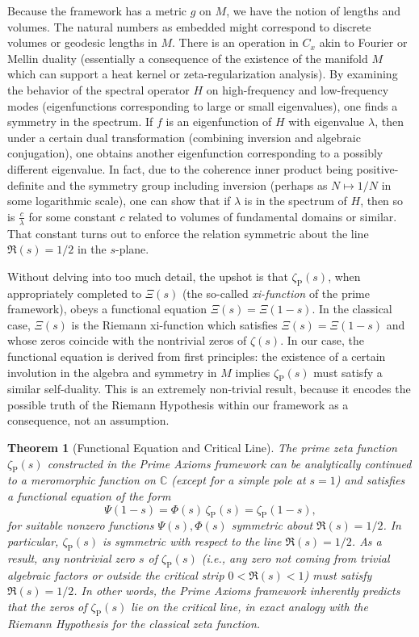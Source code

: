 \documentclass[11pt]{article}
\newtheorem{theorem}{Theorem}[section]
\begin{document}
Because the framework has a metric $g$ on $M$, we have the notion of lengths and volumes. The natural numbers as embedded might correspond to discrete volumes or geodesic lengths in $M$. There is an operation in $C_x$ akin to Fourier or Mellin duality (essentially a consequence of the existence of the manifold $M$ which can support a heat kernel or zeta-regularization analysis). By examining the behavior of the spectral operator $H$ on high-frequency and low-frequency modes (eigenfunctions corresponding to large or small eigenvalues), one finds a symmetry in the spectrum. If $f$ is an eigenfunction of $H$ with eigenvalue $\lambda$, then under a certain dual transformation (combining inversion and algebraic conjugation), one obtains another eigenfunction corresponding to a possibly different eigenvalue. In fact, due to the coherence inner product being positive-definite and the symmetry group including inversion (perhaps as $N \mapsto 1/N$ in some logarithmic scale), one can show that if $\lambda$ is in the spectrum of $H$, then so is $\frac{c}{\lambda}$ for some constant $c$ related to volumes of fundamental domains or similar. That constant turns out to enforce the relation symmetric about the line $\Re(s)=1/2$ in the $s$-plane.

Without delving into too much detail, the upshot is that $\zeta_{\mathrm{P}}(s)$, when appropriately completed to $\Xi(s)$ (the so-called \emph{xi-function} of the prime framework), obeys a functional equation $\Xi(s) = \Xi(1-s)$. In the classical case, $\Xi(s)$ is the Riemann xi-function which satisfies $\Xi(s)=\Xi(1-s)$ and whose zeros coincide with the nontrivial zeros of $\zeta(s)$. In our case, the functional equation is derived from first principles: the existence of a certain involution in the algebra and symmetry in $M$ implies $\zeta_{\mathrm{P}}(s)$ must satisfy a similar self-duality. This is an extremely non-trivial result, because it encodes the possible truth of the Riemann Hypothesis within our framework as a consequence, not an assumption.

\begin{theorem}[Functional Equation and Critical Line]
The prime zeta function $\zeta_{\mathrm{P}}(s)$ constructed in the Prime Axioms framework can be analytically continued to a meromorphic function on $\mathbb{C}$ (except for a simple pole at $s=1$) and satisfies a functional equation of the form 
\[ \Psi(1-s) = \Phi(s)\,\zeta_{\mathrm{P}}(s) = \zeta_{\mathrm{P}}(1-s), \] 
for suitable nonzero functions $\Psi(s), \Phi(s)$ symmetric about $\Re(s)=1/2$. In particular, $\zeta_{\mathrm{P}}(s)$ is symmetric with respect to the line $\Re(s)=1/2$. As a result, any nontrivial zero $s$ of $\zeta_{\mathrm{P}}(s)$ (i.e., any zero not coming from trivial algebraic factors or outside the critical strip $0<\Re(s)<1$) must satisfy $\Re(s)=1/2$. In other words, the Prime Axioms framework inherently predicts that the zeros of $\zeta_{\mathrm{P}}(s)$ lie on the critical line, in exact analogy with the Riemann Hypothesis for the classical zeta function.
\end{theorem}
\end{document}
